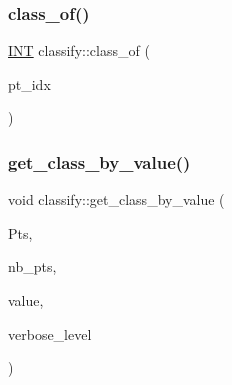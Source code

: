 \subsubsection{\texorpdfstring{class\+\_\+of()}{class\_of()}}
{\footnotesize\ttfamily \mbox{\hyperlink{galois_8h_a09fddde158a3a20bd2dcadb609de11dc}{I\+NT}} classify\+::class\+\_\+of (\begin{DoxyParamCaption}\item[{\mbox{\hyperlink{galois_8h_a09fddde158a3a20bd2dcadb609de11dc}{I\+NT}}}]{pt\+\_\+idx }\end{DoxyParamCaption})}

\mbox{\label{classclassify_ab3e85ad9a0a54ff66af9b555f1c33405}} 
\subsubsection{\texorpdfstring{get\+\_\+class\+\_\+by\+\_\+value()}{get\_class\_by\_value()}}
{\footnotesize\ttfamily void classify\+::get\+\_\+class\+\_\+by\+\_\+value (\begin{DoxyParamCaption}\item[{\mbox{\hyperlink{galois_8h_a09fddde158a3a20bd2dcadb609de11dc}{I\+NT}} $\ast$\&}]{Pts,  }\item[{\mbox{\hyperlink{galois_8h_a09fddde158a3a20bd2dcadb609de11dc}{I\+NT}} \&}]{nb\+\_\+pts,  }\item[{\mbox{\hyperlink{galois_8h_a09fddde158a3a20bd2dcadb609de11dc}{I\+NT}}}]{value,  }\item[{\mbox{\hyperlink{galois_8h_a09fddde158a3a20bd2dcadb609de11dc}{I\+NT}}}]{verbose\+\_\+level }\end{DoxyParamCaption})}

\mbox{\label{classclassify_aabcac177dd0cd34178da9a0e9252d5d9}} 
